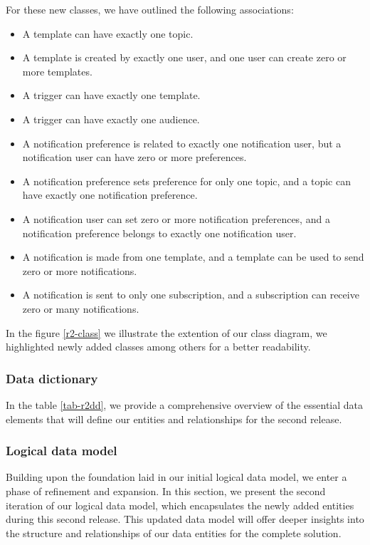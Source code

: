 \noindent For these new classes, we have outlined the following associations:

\begin{itemize}
    \item A template can have exactly one topic.
    \item A template is created by exactly one user, and one user can create zero or more templates.
    \item A trigger can have exactly one template.
    \item A trigger can have exactly one audience.
    \item A notification preference is related to exactly one notification user,
          but a notification user can have zero or more preferences.
    \item A notification preference sets preference for only one topic, and a topic can have exactly one notification preference.
    \item A notification user can set zero or more notification preferences, and a notification preference
          belongs to exactly one notification user.
    \item A notification is made from one template, and a template can be used to send zero or more notifications.
    \item A notification is sent to only one subscription, and a subscription can receive zero or many notifications.
\end{itemize}

\noindent In the figure \ref{r2-class} we illustrate the extention of our class diagram, we highlighted
newly added classes among others for a better readability.

\subsubsection{Data dictionary}
In the table \ref{tab-r2dd}, we provide a comprehensive overview of the essential data elements
that will define our entities and relationships for the second release.

\subsubsection{Logical data model}
Building upon the foundation laid in our initial logical data model, we enter a phase of refinement and
expansion. In this section, we present the second iteration of our logical data model, which encapsulates
the newly added entities during this second release. This updated data model will offer
deeper insights into the structure and relationships of our data entities for the complete solution.

